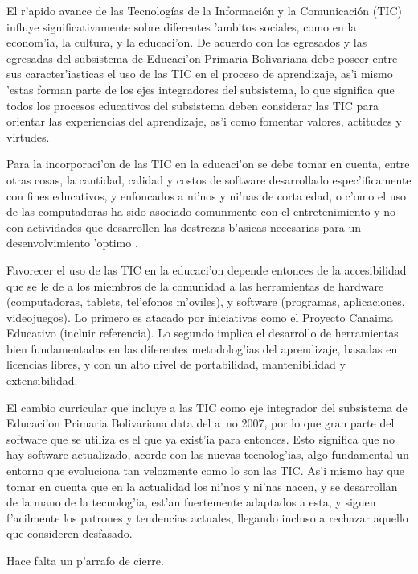 El r'apido avance de las Tecnologías de la Información y la Comunicación (TIC) influye
significativamente sobre diferentes 'ambitos sociales, como en la econom'ia, la cultura, y 
la educaci'on. De acuerdo con \cite{CurriculoSEPB} los egresados y las egresadas del subsistema
de Educaci'on Primaria Bolivariana debe poseer entre sus caracter'iasticas el uso
de las TIC en el proceso de aprendizaje, as'i mismo 'estas forman parte de los ejes
integradores del subsistema, lo que significa que todos los procesos educativos del subsistema
deben considerar las TIC para orientar las experiencias del aprendizaje, as'i como fomentar valores,
actitudes y virtudes.

Para la incorporaci'on de las TIC en la educaci'on se debe tomar en cuenta, entre otras cosas,
la cantidad, calidad y costos de software desarrollado espec'ificamente con fines educativos, y
enfoncados a ni'nos y ni'nas de corta edad, o c'omo el uso de las computadoras ha sido asociado 
comunmente con el entretenimiento y no con actividades que desarrollen las destrezas b'asicas 
necesarias para un desenvolvimiento 'optimo \cite{Archila}.

Favorecer el uso de las TIC en la educaci'on depende entonces de la accesibilidad que se le de
a los miembros de la comunidad a las herramientas de hardware (computadoras, tablets, tel'efonos
m'oviles), y software (programas, aplicaciones, videojuegos). Lo primero es atacado por iniciativas
como el Proyecto Canaima Educativo {\color{red} (incluir referencia)}. Lo segundo implica el desarrollo de herramientas bien fundamentadas en las diferentes metodolog'ias del aprendizaje,
 basadas en licencias libres, y con un alto nivel de portabilidad, mantenibilidad y extensibilidad.
 
El cambio curricular que incluye a las TIC como eje integrador del subsistema de Educaci'on
Primaria Bolivariana data del a~no 2007, por lo que gran parte del software que se utiliza
es el que ya exist'ia para entonces. Esto significa que no hay software actualizado, acorde con 
las nuevas tecnolog'ias, algo fundamental un entorno que evoluciona tan velozmente como lo son
las TIC. As'i mismo hay que tomar en cuenta que en la actualidad los ni'nos y ni'nas nacen, y se
desarrollan de la mano de la tecnolog'ia, est'an fuertemente adaptados a esta, y siguen 
f'acilmente los patrones y tendencias actuales, llegando incluso a rechazar aquello que consideren
desfasado.

{\color{red} Hace falta un p'arrafo de cierre.}

